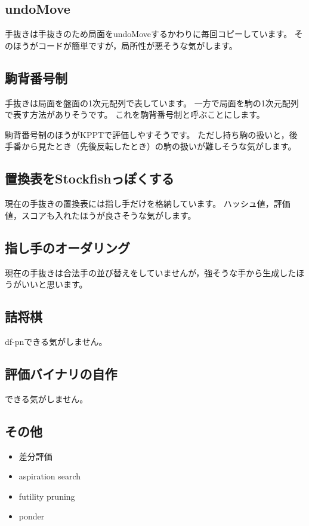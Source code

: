 \documentclass[11pt,a4paper]{ltjsarticle}
\begin{document}
\subsection{undoMove}
手抜きは手抜きのため局面をundoMoveするかわりに毎回コピーしています。
そのほうがコードが簡単ですが，局所性が悪そうな気がします。

\subsection{駒背番号制}
手抜きは局面を盤面の1次元配列で表しています。
一方で局面を駒の1次元配列で表す方法がありそうです。
これを駒背番号制と呼ぶことにします。

駒背番号制のほうがKPPTで評価しやすそうです。
ただし持ち駒の扱いと，後手番から見たとき（先後反転したとき）の駒の扱いが難しそうな気がします。

\subsection{置換表をStockfishっぽくする}
現在の手抜きの置換表には指し手だけを格納しています。
ハッシュ値，評価値，スコアも入れたほうが良さそうな気がします。

\subsection{指し手のオーダリング}
現在の手抜きは合法手の並び替えをしていませんが，強そうな手から生成したほうがいいと思います。

\subsection{詰将棋}
df-pnできる気がしません。

\subsection{評価バイナリの自作}
できる気がしません。

\subsection{その他}

\begin{itemize}
  \item 差分評価
  \item aspiration search
  \item futility pruning
  \item ponder
\end{itemize}
\end{document}
